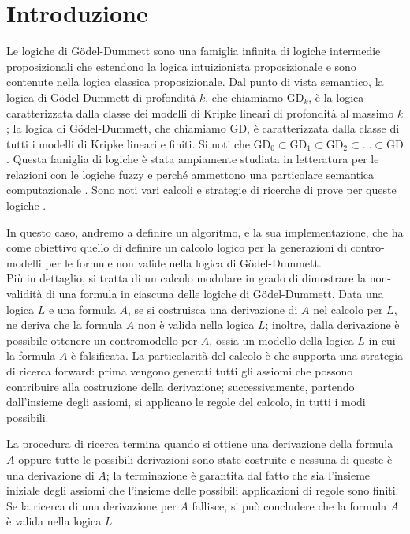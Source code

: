 \documentclass[\main/tesi.tex]{subfiles}
\begin{document}
\chapter{Introduzione}

Le logiche di G\"odel-Dummett sono una famiglia infinita di logiche
intermedie proposizionali che estendono la logica intuizionista
proposizionale
e sono contenute nella logica classica proposizionale.
Dal punto di vista semantico, la logica di  G\"odel-Dummett di profondit\`a
$k$,
che chiamiamo $\mathrm{GD}_k$,
\`e la logica caratterizzata dalla classe dei modelli di Kripke lineari
di profondit\`a
al massimo $k$; la logica di  G\"odel-Dummett,  che chiamiamo $\mathrm{GD}$,
\`e caratterizzata dalla classe di tutti i  modelli di Kripke lineari e finiti.
Si noti che $\mathrm{GD}_0\subset\mathrm{GD}_1
  \subset\mathrm{GD}_2\subset\dots\subset \mathrm{GD}$.
Questa famiglia di logiche \`e stata ampiamente studiata in letteratura
per le relazioni con le logiche
fuzzy \cite{Hajek:98} e perch\'e ammettono una particolare semantica computazionale
\cite{AscCiaGen:2017,Avron:91b}.
Sono noti vari calcoli e strategie di ricerche di prove per queste logiche \cite{Aschieri:2016,Avron:91b,BecPre:2018,FioFer:2020,Fiorino:2014,LarcheyWendling:2005}.

In questo caso, andremo a definire un algoritmo, e la sua implementazione, che ha come obiettivo quello di definire un calcolo logico per la generazioni di contro-modelli per le formule non valide nella logica di G\"odel-Dummett.\\
Pi\`u in dettaglio,
si tratta di un calcolo modulare in grado di dimostrare
la non-validit\`a di una formula in ciascuna delle logiche di
G\"odel-Dummett.
Data una logica $L$ e una formula $A$, se si costruisca una derivazione
di $A$ nel calcolo per $L$,
ne deriva che la formula $A$ non \`e valida nella logica $L$;
inoltre, dalla derivazione \`e possibile ottenere un contromodello per
$A$, ossia un modello
della logica $L$ in cui la formula $A$ \`e falsificata.
La particolarit\`a del calcolo \`e che supporta una strategia di ricerca
forward: prima vengono
generati tutti gli assiomi che possono contribuire alla costruzione
della derivazione;
successivamente, partendo dall'insieme degli assiomi, si applicano le
regole del calcolo, in tutti i modi possibili.

La procedura di ricerca termina quando si ottiene una derivazione della
formula $A$ oppure tutte le possibili derivazioni sono state costruite
e nessuna di queste \`e una derivazione di $A$; la terminazione \`e
garantita
dal fatto che sia l'insieme iniziale degli assiomi che l'insieme delle
possibili applicazioni di regole sono finiti.
Se la ricerca di una derivazione per $A$ fallisce,
si pu\`o concludere che la formula $A$ \`e valida nella logica $L$.
\end{document}
